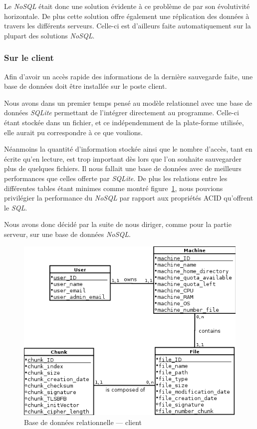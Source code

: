 \documentclass[a4paper,10pt, twoside]{report}
\begin{document}
\begin{spacing}{1.2}
Le \textit{NoSQL} était donc une solution évidente à ce problème de par
son évolutivité horizontale. De plus cette solution offre également une
réplication des données à travers les différents serveurs. Celle-ci
est d'ailleurs faite automatiquement sur la plupart des solutions
\textit{NoSQL}.

\subsubsection{Sur le client}
Afin d'avoir un accès rapide des informations de la dernière sauvegarde
faite, une base de données doit être installée sur le poste client.

Nous avons dans un premier temps pensé au modèle relationnel avec une base
de données \textit{SQLite} permettant de l'intégrer directement au
programme. Celle-ci étant stockée dans un fichier, et ce indépendemment
de la plate-forme utilisée, elle aurait pu correspondre à ce que voulions.

Néanmoins la quantité d'information stockée ainsi que le nombre d'accès,
tant en écrite qu'en lecture, est trop important dès lors que l'on souhaite
sauvegarder plus de quelques fichiers. Il nous fallait une base de données
avec de meilleurs performances que celles offerte par \textit{SQLite}. De plus
les relations entre les différentes tables étant minimes comme
montré figure~\ref{dbRelClient}, nous pouvions privilégier la performance
du \textit{NoSQL} par rapport aux propriétés ACID qu'offrent le
\textit{SQL}.

Nous avons donc décidé par la suite de nous diriger, comme pour la partie
serveur, sur une base de données \textit{NoSQL}.

\begin{figure}[h!]
  \centering
  \includegraphics[scale=0.69]{softwareDesign/dbRelClient.png}
  \caption{\label{dbRelClient} Base de données relationnelle --- client}
\end{figure}


\end{spacing}
\end{document}
